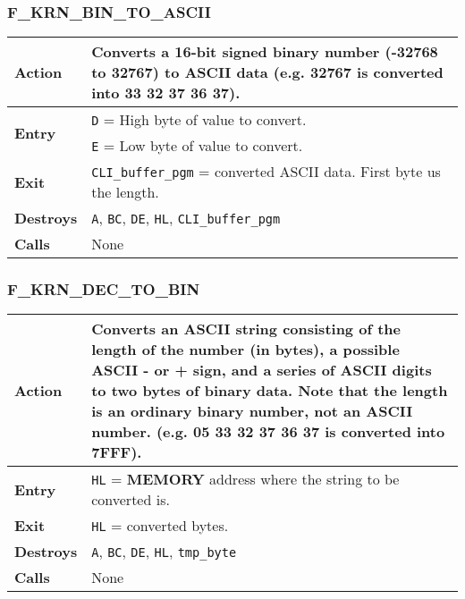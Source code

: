     \subsubsection{F\_KRN\_BIN\_TO\_ASCII}
    \label{func:fkrnbintoascii}
    \begin{tabular}{l p{9cm}}
        \hline\textbf{Action}
        & Converts a 16-bit signed binary number (-32768 to 32767) to ASCII
        data (e.g. 32767 is converted into 33 32 37 36 37).\\
        \hline\multirow[t]{2}{4em}{\textbf{Entry}}
        & \texttt{D} = High byte of value to convert.\\
        & \texttt{E} = Low byte of value to convert.\\
        \hline\textbf{Exit} & \texttt{CLI\_buffer\_pgm} = converted ASCII data.
        First byte us the length.\\
        \hline\textbf{Destroys} & \texttt{A}, \texttt{BC}, \texttt{DE}, 
        \texttt{HL}, \texttt{CLI\_buffer\_pgm}\\
        \hline\textbf{Calls} & None\\
        \hline
    \end{tabular}

    \subsubsection{F\_KRN\_DEC\_TO\_BIN}
    \label{func:fkrndectobin}
    \begin{tabular}{l p{9cm}}
        \hline\textbf{Action}
        & Converts an ASCII string consisting of the length of the number
        (in bytes), a possible ASCII - or + sign, and a series of ASCII
        digits to two bytes of binary data. Note that the length is an
        ordinary binary number, not an ASCII number. (e.g. 05 33 32 37 36 37
        is converted into 7FFF).\\
        \hline\textbf{Entry} & \texttt{HL} = \textbf{MEMORY} address where
        the string to be converted is.\\
        \hline\textbf{Exit} & \texttt{HL} = converted bytes.\\
        \hline\textbf{Destroys} & \texttt{A}, \texttt{BC}, \texttt{DE}, 
        \texttt{HL}, \texttt{tmp\_byte}\\
        \hline\textbf{Calls} & None\\
        \hline
    \end{tabular}

